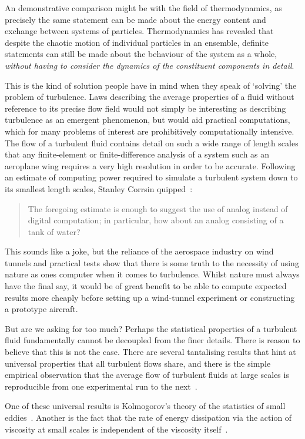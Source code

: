 An demonstrative comparison might be with the field of thermodynamics, as precisely the same statement can be made about the energy content and exchange between systems of particles. Thermodynamics has revealed that despite the chaotic motion of individual particles in an ensemble, definite statements can still be made about the behaviour of the system as a whole, \emph{without having to consider the dynamics of the constituent components in detail}.

This is the kind of solution people have in mind when they speak of `solving' the problem of turbulence. Laws describing the average properties of a fluid without reference to its precise flow field would not simply be interesting as describing turbulence as an emergent phenomenon, but would aid practical computations, which for many problems of interest are prohibitively computationally intensive. The flow of a turbulent fluid contains detail on such a  wide range of length scales that any finite-element or finite-difference analysis of a system such as an aeroplane wing requires a very high resolution in order to be accurate. Following an estimate of computing power required to simulate a turbulent system down to its smallest length scales, Stanley Corrsin quipped~\cite{corrsin_turbulent_1961}:
\begin{quote}
The foregoing estimate  is enough to suggest the use of analog instead of digital  computation; in particular, how about an analog consisting of a tank of water?
\end{quote}
This sounds like a joke, but the reliance of the aerospace industry on wind tunnels and practical tests show that there is some truth to the necessity of using nature as ones computer when it comes to turbulence. Whilst nature must always have the final say, it would be of great benefit to be able to compute expected results more cheaply before setting up a wind-tunnel experiment or constructing a prototype aircraft.

But are we asking for too much? Perhaps the statistical properties of a turbulent fluid fundamentally cannot be decoupled from the finer details. There is reason to believe that this is not the case. There are several tantalising results that hint at universal properties that all turbulent flows share, and there is the simple empirical observation that the average flow of turbulent fluids at large scales is reproducible from one experimental run to the next~\cite[pp 13, 86]{davidson_turbulence:_2004}.

One of these universal results is Kolmogorov's theory of the statistics of small eddies~\cite{kolmogorov_local_1941, spalding_kolmogorovs_1991}. Another is the fact that the rate of energy dissipation via the action of viscosity at small scales is independent of the viscosity itself~\cite[p 77]{davidson_turbulence:_2004}.

